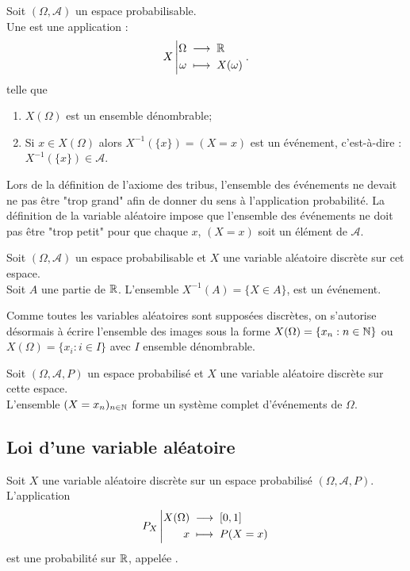 \documentclass{book}
\begin{document}
\begin{Definition}
Soit $(\Omega,\mathcal{A})$ un espace probabilisable.\\
Une  est une application : $${X}\left|\begin{aligned}{\Omega}&\;\longrightarrow\;{\mathbb{R}}\\{\omega}&\;\longmapsto\;{X(\omega)}\end{aligned}\right..$$ telle que
\begin{enumerate}
\item $X (\Omega)$ est un ensemble dénombrable;
\item Si $x \in X (\Omega)$ alors $X^{-1}(\{x \}) = (X = x )$ est un événement, c'est-à-dire :$X^{-1}(\{x \})\in \mathcal{A}$.
\end{enumerate}
\end{Definition}
\begin{Remarque}
Lors de la définition de l'axiome des tribus, l'ensemble des événements ne devait ne pas être "trop grand" afin de donner du sens à l'application probabilité. La définition de la variable aléatoire impose que l'ensemble des événements ne doit pas être "trop petit" pour que chaque $x$, $(X = x )$ soit un élément de $\mathcal{A}$.
\end{Remarque}

\begin{Proposition}
Soit $(\Omega,\mathcal{A})$ un espace probabilisable et $X$ une variable aléatoire discrète sur cet espace.\\
Soit $A$ une partie de $\mathbb{R}$. L'ensemble $X^{-1}(A)=\{X \in A\}$, est un événement.
\end{Proposition}
Comme toutes les variables aléatoires sont supposées discrètes, on s'autorise désormais à écrire l'ensemble des images sous la forme $X (\Omega) = \{x_n:n\in \mathbb{N}\}$ ou $X (\Omega) = \{x_i:i\in I\}$ avec $I$ ensemble dénombrable.
\begin{Proposition}
Soit $(\Omega,\mathcal{A},P)$ un espace probabilisé et $X$ une variable aléatoire discrète sur cette espace.\\
L'ensemble $(X=x_n)_{n\in\mathbb{N}}$ forme un système complet d'événements de $\Omega$.
\end{Proposition}
\subsection{Loi d'une variable aléatoire}
\begin{Definition}
Soit $X$ une variable aléatoire discrète sur un espace probabilisé $(\Omega,\mathcal{A},P)$.\\ 
L'application
\[ {P_X}\left|\begin{aligned}{X(\Omega)}&\;\longrightarrow\;{[0,1]}\\{x}&\;\longmapsto\;{P(X=x)}\end{aligned}\right. \]
est une probabilité sur $\mathbb{R}$, appelée .
\end{Definition}
\end{document}
